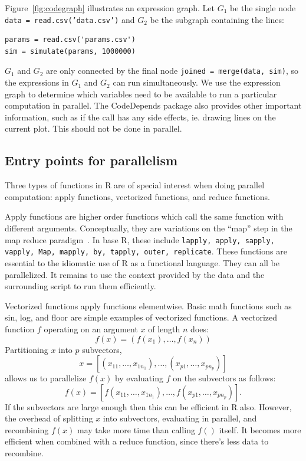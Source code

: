 \documentclass[12pt]{article}
\begin{document}
Figure~\ref{fig:codegraph} illustrates an expression graph.
Let $G_1$ be the single node \texttt{data = read.csv('data.csv')} and $G_2$ be the subgraph containing the lines:
\begin{verbatim}
params = read.csv('params.csv')
sim = simulate(params, 1000000)
\end{verbatim}
$G_1$ and $G_2$ are only connected by the final node \texttt{joined =
merge(data, sim)}, so the expressions in $G_1$ and $G_2$ can run
simultaneously.  We use the expression graph to determine which variables
need to be available to run a particular computation in parallel. The
CodeDepends package also provides other important information, such as if
the call has any side effects, ie. drawing lines on the current plot. This
should not be done in parallel.

\subsection{Entry points for parallelism}

\label{sec:parallel_points}

Three types of functions in R are of special interest when doing parallel
computation: apply functions, vectorized functions, and reduce functions.

Apply functions are higher order functions which call the same function
with different arguments. Conceptually, they are variations on the ``map''
step in the map reduce paradigm~\cite{dean2008mapreduce}.  In base R, these
include \texttt{lapply, apply, sapply, vapply, Map, mapply, by, tapply,
outer, replicate}. These functions are essential to the idiomatic use of R
as a functional language. They can all be parallelized. It remains to use
the context provided by the data and the surrounding script to run
them efficiently. 

Vectorized functions apply functions elementwise. Basic math functions such
as sin, log, and floor are simple examples of vectorized functions.  A
vectorized function $f$ operating on an argument $x$ of length $n$ does:
\begin{equation}
\label{eq:vectorization}
    f(x) = (f(x_1), \dots, f(x_n))
\end{equation}
Partitioning $x$ into $p$ subvectors, 
\[
    x = \left[ (x_{11}, \dots, x_{1 n_1}), \dots, (x_{p 1}, \dots, x_{p
n_p}) \right]
\]
allows us to parallelize $f(x)$ by evaluating $f$ on the subvectors as follows:
\[
    f(x) = \left[ f(x_{11}, \dots, x_{1 n_1}), \dots, f(x_{p 1}, \dots, x_{p
n_p}) \right].
\]
If the subvectors are large enough then this can be efficient in R also.
However, the overhead of splitting $x$ into subvectors, evaluating in
parallel, and recombining $f(x)$ may take more time than calling $f()$
itself. It becomes more efficient when combined with a reduce function,
since there's less data to recombine.
\end{document}
